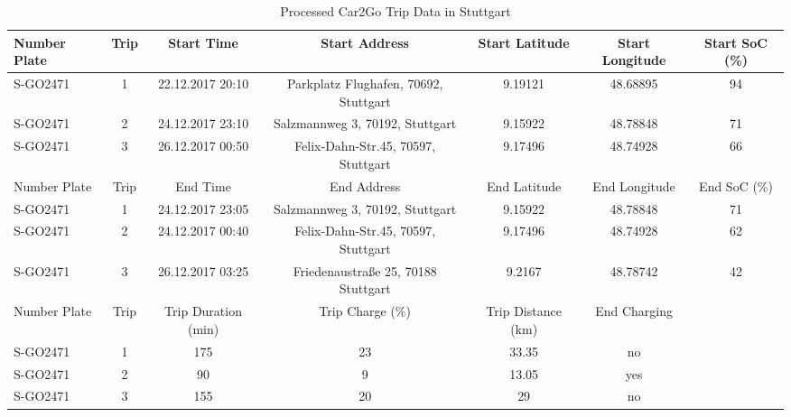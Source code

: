 \begin{sidewaystable}[htbp]
    \caption{Processed Car2Go Trip Data in Stuttgart \label{data-car2go-processed}}
    \centering
    \begin{tabular}{lc|ccccc}
      \hline
      \hline
      Number Plate & Trip & Start Time & Start Address & Start Latitude & Start Longitude & Start SoC (\%)\\
      \hline
      S-GO2471 & 1 & 22.12.2017 20:10 & Parkplatz Flughafen, 70692, Stuttgart & 9.19121 & 48.68895 & 94\\
      S-GO2471 & 2 & 24.12.2017 23:10 & Salzmannweg 3, 70192, Stuttgart & 9.15922 & 48.78848 & 71\\
      S-GO2471 & 3 & 26.12.2017 00:50 & Felix-Dahn-Str.45, 70597, Stuttgart & 9.17496 & 48.74928 & 66\\
      \hline
      Number Plate & Trip & End Time & End Address & End Latitude & End Longitude & End SoC (\%)\\
      \hline
      S-GO2471 & 1 & 24.12.2017 23:05 & Salzmannweg 3, 70192, Stuttgart & 9.15922 & 48.78848 & 71\\
      S-GO2471 & 2 & 24.12.2017 00:40 & Felix-Dahn-Str.45, 70597, Stuttgart & 9.17496 & 48.74928 & 62\\
      S-GO2471 & 3 & 26.12.2017 03:25 & Friedenaustraße 25, 70188 Stuttgart & 9.2167 & 48.78742 & 42\\
      \hline
      Number Plate & Trip & Trip Duration (min) & Trip Charge (\%) & Trip Distance (km) & End Charging & \\
      \hline
      S-GO2471 & 1 & 175 & 23 & 33.35 & no & \\
      S-GO2471 & 2 & 90 & 9 & 13.05 & yes & \\
      S-GO2471 & 3 & 155 & 20 & 29 & no & \\
      \hline
      \hline
\end{tabular}
\end{sidewaystable}
